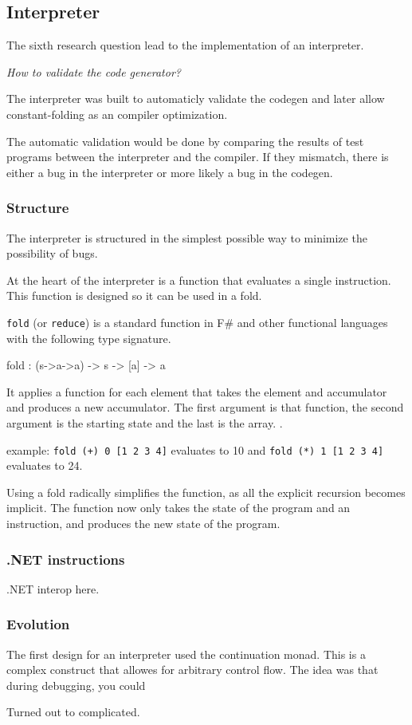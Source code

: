 \subsection{Interpreter}
The sixth research question lead to the implementation of an interpreter.

\textit{How to validate the code generator?}

The interpreter was built to automaticly validate the codegen and later allow constant-folding as an compiler optimization.

The automatic validation would be done by comparing the results of test programs between the interpreter and the compiler.
If they mismatch, there is either a bug in the interpreter or more likely a bug in the codegen.

\subsubsection{Structure}
The interpreter is structured in the simplest possible way to minimize the possibility of bugs.

At the heart of the interpreter is a function that evaluates a single instruction.
This function is designed so it can be used in a fold.

\verb|fold| (or \verb|reduce|) is a standard function in F\# and other functional languages with the following type signature.

\begin{code}
    fold : (s->a->a) -> s -> [a] -> a
\end{code}

It applies a function for each element that takes the element and accumulator and produces a new accumulator.
The first argument is that function, the second argument is the starting state and the last is the array.
\cite{realworldhaskellch4}.

example: \texttt{fold (+) 0 [1 2 3 4]} evaluates to 10 and \texttt{fold (*) 1 [1 2 3 4]} evaluates to 24.

Using a fold radically simplifies the function, as all the explicit recursion becomes implicit.
The function now only takes the state of the program and an instruction, and produces the new state of the program.

\subsubsection{.NET instructions}
.NET interop here.

\subsubsection{Evolution}
The first design for an interpreter used the continuation monad.
This is a complex construct that allowes for arbitrary control flow.
The idea was that during debugging, you could 

Turned out to complicated.
